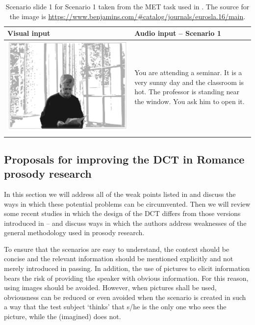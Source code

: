 \documentclass[output=paper]{LSP/langsci}
\begin{document}
\begin{table}
\begin{tabularx}{\textwidth}{p{}Q}
\lsptoprule
 Visual input &  Audio input – Scenario 1 \\
 \midrule
 \vspace*{0pt}
 \includegraphics[width=.6\textwidth]{figures/readerphoto1.pdf} & \vspace*{0pt} You are attending a seminar. It is a very sunny day and the classroom is hot. The professor is standing near the window. You ask him to open it.\\
\lspbottomrule
\end{tabularx}
\caption{\label{tab:van:2}Scenario slide 1 for Scenario 1 taken from the MET task used in \citet{Schauer2004}. The source for the image is \url{https://www.benjamins.com/\#catalog/journals/eurosla.16/main}.} 
\end{table}

\subsection{Proposals for improving the DCT in Romance prosody research}
\label{sec:van:3.2}
In this section we will address all of the weak points listed in  and discuss the ways in which these potential problems can be circumvented. Then we will review some recent studies in which the design of the DCT differs from those versions introduced in -- and discuss ways in which the authors address weaknesses of the general methodology used in prosody research.

To ensure that the scenarios are easy to understand, the context should be concise and the relevant information should be mentioned explicitly and not merely introduced in passing. In addition, the use of pictures to elicit information bears the risk of providing the speaker with obvious information. For this reason, using images should be avoided. However, when pictures shall be used, obviousness can be reduced or even avoided when the scenario is created in such a way that the test subject ‘thinks’ that s/he is the only one who sees the picture, while the (imagined)  does not.\largerpage
\end{document}
